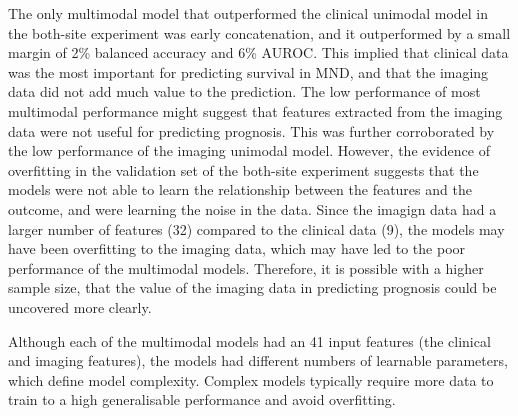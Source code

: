 The only multimodal model that outperformed the clinical unimodal model in the both-site experiment was early concatenation, and it outperformed by a small margin of 2\% balanced accuracy and 6\% AUROC.
This implied that clinical data was the most important for predicting survival in MND, and that the imaging data did not add much value to the prediction.
The low performance of most multimodal performance might suggest that features extracted from the imaging data were not useful for predicting prognosis.
This was further corroborated by the low performance of the imaging unimodal model.
However, the evidence of overfitting in the validation set of the both-site experiment suggests that the models were not able to learn the relationship between the features and the outcome, and were learning the noise in the data.
Since the imagign data had a larger number of features (32) compared to the clinical data (9), the models may have been overfitting to the imaging data, which may have led to the poor performance of the multimodal models.
Therefore, it is possible with a higher sample size, that the value of the imaging data in predicting prognosis could be uncovered more clearly.

Although each of the multimodal models had an 41 input features (the clinical and imaging features), the models had different numbers of learnable parameters, which define model complexity.
Complex models typically require more data to train to a high generalisable performance and avoid overfitting.




